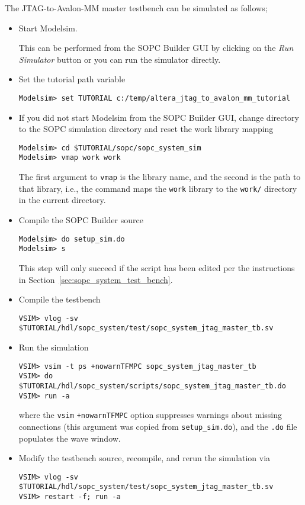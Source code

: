 \documentclass[10pt,twoside]{article}
\begin{document}
\clearpage
The JTAG-to-Avalon-MM master testbench can be simulated as follows;
%
\begin{itemize}
\item Start Modelsim.

This can be performed from the SOPC Builder GUI by clicking on
the {\em Run Simulator} button or you can run the simulator directly.

\item Set the tutorial path variable
%
\begin{verbatim}
Modelsim> set TUTORIAL c:/temp/altera_jtag_to_avalon_mm_tutorial
\end{verbatim}
%
\item If you did not start Modelsim from the SOPC Builder GUI,
change directory to the SOPC simulation directory and reset the
work library mapping
%
\begin{verbatim}
Modelsim> cd $TUTORIAL/sopc/sopc_system_sim
Modelsim> vmap work work
\end{verbatim}
%
The first argument to \verb+vmap+ is the library name, and
the second is the path to that library, i.e., the command
maps the \verb+work+ library to the \verb+work/+
directory in the current directory.
%
\item Compile the SOPC Builder source
%
\begin{verbatim}
Modelsim> do setup_sim.do
Modelsim> s
\end{verbatim}
%
This step will only succeed if the script has been edited per
the instructions in Section~\ref{sec:sopc_system_test_bench}.
%
\item Compile the testbench
%
\begin{verbatim}
VSIM> vlog -sv $TUTORIAL/hdl/sopc_system/test/sopc_system_jtag_master_tb.sv
\end{verbatim}
%
\item Run the simulation 
%
\begin{verbatim}
VSIM> vsim -t ps +nowarnTFMPC sopc_system_jtag_master_tb
VSIM> do $TUTORIAL/hdl/sopc_system/scripts/sopc_system_jtag_master_tb.do
VSIM> run -a
\end{verbatim}
%
where the \verb+vsim+ \verb|+nowarnTFMPC| option suppresses warnings 
about missing connections (this argument was copied from \verb+setup_sim.do+),
and the \verb+.do+ file populates the wave window.
%
\item Modify the testbench source, recompile, and rerun the simulation via
%
\begin{verbatim}
VSIM> vlog -sv $TUTORIAL/hdl/sopc_system/test/sopc_system_jtag_master_tb.sv
VSIM> restart -f; run -a
\end{verbatim}
%
\end{itemize}
\end{document}
